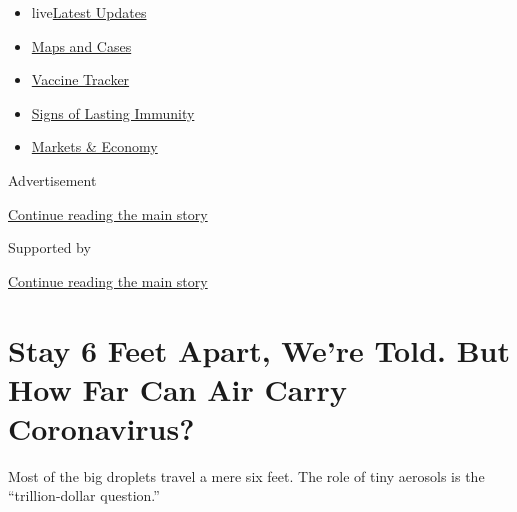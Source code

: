 \begin{itemize}
\tightlist
\item
  live\href{https://www.nytimes.com/2020/08/17/world/covid-19-coronavirus.html?name=styln-coronavirus-national\&region=TOP_BANNER\&variant=undefined\&block=storyline_menu_recirc\&action=click\&pgtype=Article\&impression_id=01055611-e094-11ea-a1e6-87c05b38070b}{Latest
  Updates}
\item
  \href{https://www.nytimes.com/interactive/2020/us/coronavirus-us-cases.html?name=styln-coronavirus-national\&region=TOP_BANNER\&variant=undefined\&block=storyline_menu_recirc\&action=click\&pgtype=Article\&impression_id=01055612-e094-11ea-a1e6-87c05b38070b}{Maps
  and Cases}
\item
  \href{https://www.nytimes.com/interactive/2020/science/coronavirus-vaccine-tracker.html?name=styln-coronavirus-national\&region=TOP_BANNER\&variant=undefined\&block=storyline_menu_recirc\&action=click\&pgtype=Article\&impression_id=01055613-e094-11ea-a1e6-87c05b38070b}{Vaccine
  Tracker}
\item
  \href{https://www.nytimes.com/2020/08/16/health/coronavirus-immunity-antibodies.html?name=styln-coronavirus-national\&region=TOP_BANNER\&variant=undefined\&block=storyline_menu_recirc\&action=click\&pgtype=Article\&impression_id=01055614-e094-11ea-a1e6-87c05b38070b}{Signs
  of Lasting Immunity}
\item
  \href{https://www.nytimes.com/live/2020/08/17/business/stock-market-today-coronavirus?name=styln-coronavirus-national\&region=TOP_BANNER\&variant=undefined\&block=storyline_menu_recirc\&action=click\&pgtype=Article\&impression_id=01055615-e094-11ea-a1e6-87c05b38070b}{Markets
  \& Economy}
\end{itemize}

Advertisement

\protect\hyperlink{after-top}{Continue reading the main story}

Supported by

\protect\hyperlink{after-sponsor}{Continue reading the main story}

\hypertarget{stay-6-feet-apart-were-told-but-how-far-can-air-carry-coronavirus}{%
\section{Stay 6 Feet Apart, We're Told. But How Far Can Air Carry
Coronavirus?}\label{stay-6-feet-apart-were-told-but-how-far-can-air-carry-coronavirus}}

Most of the big droplets travel a mere six feet. The role of tiny
aerosols is the ``trillion-dollar question.''

